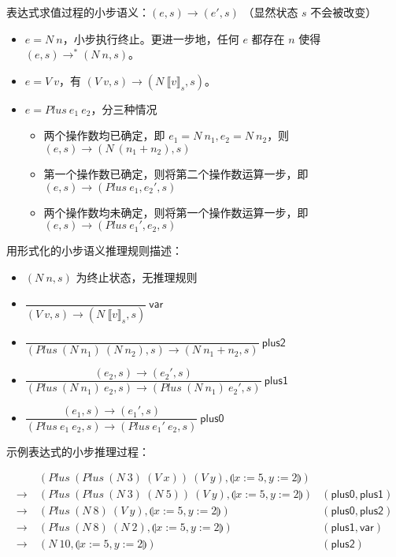 \documentclass[UTF8]{ctexart}
\begin{document}
    表达式求值过程的小步语义：$(e, s) \to (e', s)$ （显然状态 $s$ 不会被改变） \begin{itemize}
        \item $e=N\ n$，小步执行终止。更进一步地，任何 $e$ 都存在 $n$ 使得 $(e, s) \to^{\ast} (N\ n, s)$。
        \item $e=V\ v$，有 $(V\ v, s) \to (N\ {\llbracket v \rrbracket}_s, s)$。
        \item $e=Plus\ e_1\ e_2$，分三种情况 \begin{itemize}
            \item 两个操作数均已确定，即 $e_1=N\ n_1, e_2=N\ n_2$，则 $(e, s) \to (N\ (n_1+n_2), s)$
            \item 第一个操作数已确定，则将第二个操作数运算一步，即 $(e, s) \to (Plus\ e_1, e_2', s)$
            \item 两个操作数均未确定，则将第一个操作数运算一步，即 $(e, s) \to (Plus\ e_1', e_2, s)$
        \end{itemize}
    \end{itemize}

    用形式化的小步语义推理规则描述：\begin{itemize}
        \setlength{\itemsep}{1em}
        \setlength{\parsep}{1em}
        \item $(N\ n, s)$ 为终止状态，无推理规则
        \item $\dfrac{}{(V\ v, s) \to (N\ {\llbracket v \rrbracket}_s, s)}\ \mathsf{var}$
        \item $\dfrac{}{(Plus\ (N\ n_1)\ (N\ n_2), s) \to (N\ n_1+n_2, s)}\ \mathsf{plus2}$
        \item $\dfrac{(e_2, s) \to (e_2', s)}{(Plus\ (N\ n_1)\ e_2, s) \to (Plus\ (N\ n_1)\ e_2', s)}\ \mathsf{plus1}$
        \item $\dfrac{(e_1, s) \to (e_1', s)}{(Plus\ e_1\ e_2, s) \to (Plus\ e_1'\ e_2, s)}\ \mathsf{plus0}$
    \end{itemize}

    \setlength{\parskip}{1em}
    示例表达式的小步推理过程：
    \setlength{\parskip}{0em}

    \begin{align*}
       & (Plus\ (Plus\ (N\ 3)\ (V\ x))\ (V\ y), \llparenthesis x:=5, y:=2 \rrparenthesis) \\
       \to\ & (Plus\ (Plus\ (N\ 3)\ (N\ 5))\ (V\ y), \llparenthesis x:=5, y:=2 \rrparenthesis) & (\mathsf{plus0}, \mathsf{plus1}) \\
       \to\ & (Plus\ (N\ 8)\ (V\ y), \llparenthesis x:=5, y:=2 \rrparenthesis) & (\mathsf{plus0}, \mathsf{plus2}) \\
       \to\ & (Plus\ (N\ 8)\ (N\ 2), \llparenthesis x:=5, y:=2 \rrparenthesis) & (\mathsf{plus1}, \mathsf{var}) \\
       \to\ & (N\ 10, \llparenthesis x:=5, y:=2 \rrparenthesis) & (\mathsf{plus2})
    \end{align*}
\end{document}
